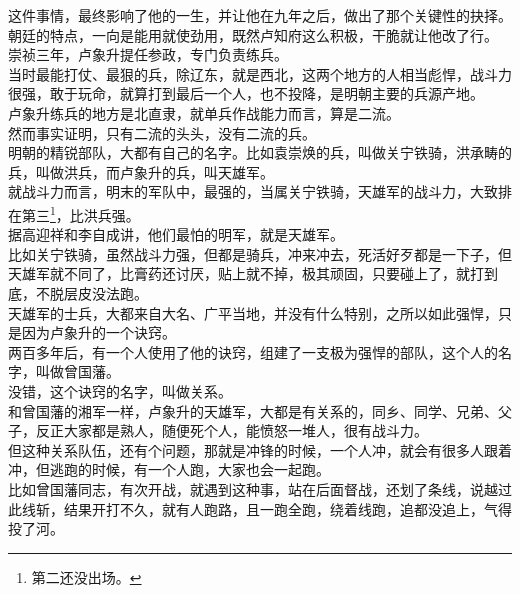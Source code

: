 \begin{multicols}{\theparacolNo}
这件事情，最终影响了他的一生，并让他在九年之后，做出了那个关键性的抉择。\\

朝廷的特点，一向是能用就使劲用，既然卢知府这么积极，干脆就让他改了行。\\

崇祯三年，卢象升提任参政，专门负责练兵。\\

当时最能打仗、最狠的兵，除辽东，就是西北，这两个地方的人相当彪悍，战斗力很强，敢于玩命，就算打到最后一个人，也不投降，是明朝主要的兵源产地。\\

卢象升练兵的地方是北直隶，就单兵作战能力而言，算是二流。\\

然而事实证明，只有二流的头头，没有二流的兵。\\

明朝的精锐部队，大都有自己的名字。比如袁崇焕的兵，叫做关宁铁骑，洪承畴的兵，叫做洪兵，而卢象升的兵，叫天雄军。\\

就战斗力而言，明末的军队中，最强的，当属关宁铁骑，天雄军的战斗力，大致排在第三\footnote{第二还没出场。}，比洪兵强。\\

据高迎祥和李自成讲，他们最怕的明军，就是天雄军。\\

比如关宁铁骑，虽然战斗力强，但都是骑兵，冲来冲去，死活好歹都是一下子，但天雄军就不同了，比膏药还讨厌，贴上就不掉，极其顽固，只要碰上了，就打到底，不脱层皮没法跑。\\

天雄军的士兵，大都来自大名、广平当地，并没有什么特别，之所以如此强悍，只是因为卢象升的一个诀窍。\\

两百多年后，有一个人使用了他的诀窍，组建了一支极为强悍的部队，这个人的名字，叫做曾国藩。\\

没错，这个诀窍的名字，叫做关系。\\

和曾国藩的湘军一样，卢象升的天雄军，大都是有关系的，同乡、同学、兄弟、父子，反正大家都是熟人，随便死个人，能愤怒一堆人，很有战斗力。\\

但这种关系队伍，还有个问题，那就是冲锋的时候，一个人冲，就会有很多人跟着冲，但逃跑的时候，有一个人跑，大家也会一起跑。\\

比如曾国藩同志，有次开战，就遇到这种事，站在后面督战，还划了条线，说越过此线斩，结果开打不久，就有人跑路，且一跑全跑，绕着线跑，追都没追上，气得投了河。\\


\end{multicols}
